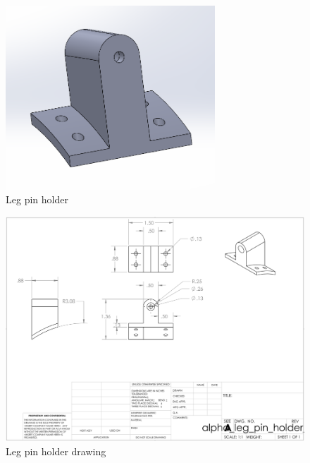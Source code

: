 \begin{figure}[H]
    \centering
    \includegraphics[width=0.7\textwidth]{src/figs/cad-and-dwgs/leg-pin-holder-cad.png}
    \caption{Leg pin holder}
    \label{cad:leg-pin-holder}
\end{figure}

\begin{figure}[H]
    \centering
    \includegraphics[width=\textwidth]{src/figs/cad-and-dwgs/leg_pin_holder_dwg.png}
    \caption{Leg pin holder drawing}
    \label{cad:leg-pin-holder:dwg}
\end{figure}

